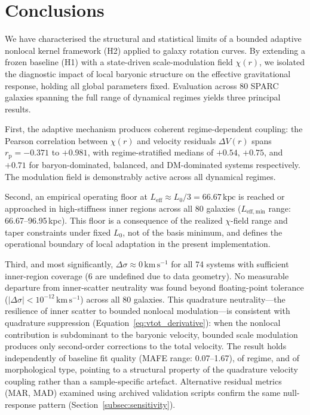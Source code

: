 \documentclass[twocolumn,linenumbers]{aastex701}
\begin{document}
\section{Conclusions}

We have characterised the structural and statistical limits of a bounded
adaptive nonlocal kernel framework (H2) applied to galaxy rotation curves.
By extending a frozen baseline (H1) with a state-driven scale-modulation
field $\chi(r)$, we isolated the diagnostic impact of local baryonic
structure on the effective gravitational response, holding all global
parameters fixed. Evaluation across 80 SPARC galaxies spanning the full
range of dynamical regimes yields three principal results.

First, the adaptive mechanism produces coherent regime-dependent coupling:
the Pearson correlation between $\chi(r)$ and velocity residuals $\Delta V(r)$
spans $r_\mathrm{p} = -0.371$ to $+0.981$, with regime-stratified medians
of $+0.54$, $+0.75$, and $+0.71$ for baryon-dominated, balanced, and
DM-dominated systems respectively. The modulation field is demonstrably
active across all dynamical regimes.

Second, an empirical operating floor at $L_\mathrm{eff} \approx L_0/3 =
66.67\,\mathrm{kpc}$ is reached or approached in high-stiffness inner
regions across all 80 galaxies ($L_\mathrm{eff,min}$ range:
66.67--96.95\,kpc). This floor is a consequence of the realized $\chi$-field
range and taper constraints under fixed $L_0$, not of the basis minimum,
and defines the operational boundary of local adaptation in the present
implementation.

Third, and most significantly, $\Delta\sigma \approx 0\,\mathrm{km\,s^{-1}}$
for all 74 systems with sufficient inner-region coverage (6 are undefined due
to data geometry). No measurable departure from inner-scatter neutrality was
found beyond floating-point tolerance ($|\Delta\sigma| < 10^{-12}\,\mathrm{km\,s^{-1}}$)
across all 80 galaxies. This quadrature neutrality---the resilience of inner
scatter to bounded nonlocal modulation---is consistent with quadrature
suppression (Equation~\ref{eq:vtot_derivative}): when the nonlocal contribution
is subdominant to the baryonic velocity, bounded scale modulation produces
only second-order corrections to the total velocity. The result holds
independently of baseline fit quality (MAFE range: 0.07--1.67), of regime,
and of morphological type, pointing to a structural property of the
quadrature velocity coupling rather than a sample-specific artefact.
Alternative residual metrics (MAR, MAD) examined using archived validation
scripts confirm the same null-response pattern (Section~\ref{subsec:sensitivity}).
\end{document}
